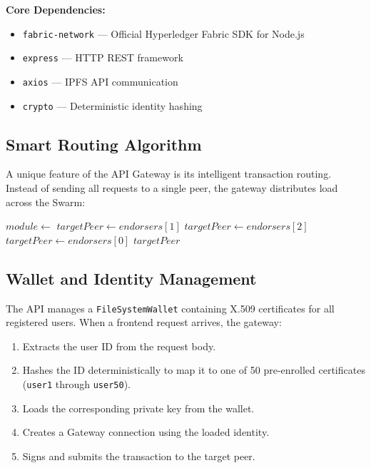 \textbf{Core Dependencies:}
\begin{itemize}
    \item \texttt{fabric-network} — Official Hyperledger Fabric SDK for Node.js
    \item \texttt{express} — HTTP REST framework
    \item \texttt{axios} — IPFS API communication
    \item \texttt{crypto} — Deterministic identity hashing
\end{itemize}

\subsection{Smart Routing Algorithm}

A unique feature of the API Gateway is its intelligent transaction routing. Instead of sending all requests to a single peer, the gateway distributes load across the Swarm:

\begin{algorithm}[H]
\caption{Smart Transaction Routing}
\label{alg:routing}
\begin{algorithmic}[1]
    \State $module \gets$ 
        \State $targetPeer \gets endorsers[1]$ 
        \State $targetPeer \gets endorsers[2]$ 
    \Else
        \State $targetPeer \gets endorsers[0]$ 
    \EndIf
    \State \Return $targetPeer$
\EndProcedure
\end{algorithmic}
\end{algorithm}

\subsection{Wallet and Identity Management}

The API manages a \texttt{FileSystemWallet} containing X.509 certificates for all registered users. When a frontend request arrives, the gateway:

\begin{enumerate}
    \item Extracts the user ID from the request body.
    \item Hashes the ID deterministically to map it to one of 50 pre-enrolled certificates (\texttt{user1} through \texttt{user50}).
    \item Loads the corresponding private key from the wallet.
    \item Creates a Gateway connection using the loaded identity.
    \item Signs and submits the transaction to the target peer.
\end{enumerate}

